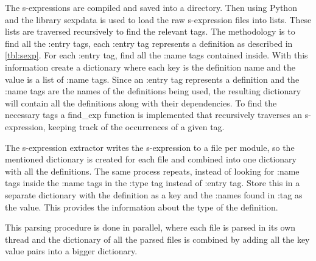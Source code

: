 The s-expressions are compiled and saved into a directory. Then using Python
and the library sexpdata is used to load the raw s-expression files into lists.
These lists are traversed recursively to find the relevant tags. The
methodology is to find all the :entry tags, each :entry tag represents a
definition as described in \cref{tbl:sexp}. For each :entry tag, find all the
:name tags contained inside. With this information create a dictionary where
each key is the definition name and the value is a list of :name tags. Since an
:entry tag represents a definition and the :name tags are the names of the
definitions being used, the resulting dictionary will contain all the
definitions along with their dependencies. To find the necessary tags a
\textsf{find\_exp} function is implemented that recursively traverses an
s-expression, keeping track of the occurrences of a given tag.

The s-expression extractor writes the s-expression to a file per module, so the
mentioned dictionary is created for each file and combined into one dictionary
with all the definitions. The same process repeats, instead of looking for
:name tags inside the :name tags in the :type tag instead of :entry tag. Store
this in a separate dictionary with the definition as a key and the :names found
in :tag as the value. This provides the information about the type of the
definition.

This parsing procedure is done in parallel, where each file is parsed in its
own thread and the dictionary of all the parsed files is combined by
adding all the key value pairs into a bigger dictionary.


